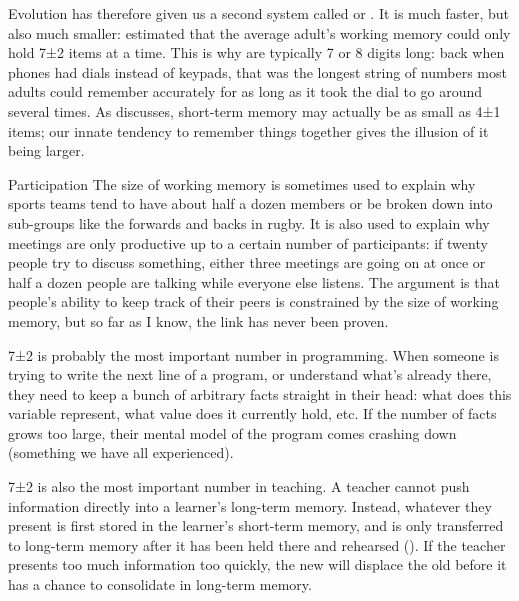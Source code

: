 Evolution has therefore given us a second system called
 or . It is much faster, but also much smaller:
\cite{Mill1956} estimated that the average adult's working memory
could only hold 7±2 items at a time. This is why  are typically 7 or 8 digits long: back when
phones had dials instead of keypads, that was the longest string of
numbers most adults could remember accurately for as long as it took
the dial to go around several times. As 
discusses, short-term memory may actually be as small as 4±1 items;
our innate tendency to remember things together gives the illusion of
it being larger.

\begin{aside}{Participation}
  The size of working memory is sometimes used to explain why sports
  teams tend to have about half a dozen members or be broken down into
  sub-groups like the forwards and backs in rugby. It is also used to
  explain why meetings are only productive up to a certain number of
  participants: if twenty people try to discuss something, either three
  meetings are going on at once or half a dozen people are talking while
  everyone else listens. The argument is that people's ability to keep
  track of their peers is constrained by the size of working memory, but
  so far as I know, the link has never been proven.
\end{aside}

7±2 is probably the most important number in programming. When
someone is trying to write the next line of a program, or understand
what's already there, they need to keep a bunch of arbitrary facts
straight in their head: what does this variable represent, what value
does it currently hold, etc. If the number of facts grows too large,
their mental model of the program comes crashing down (something we have
all experienced).

7±2 is also the most important number in teaching. A teacher cannot
push information directly into a learner's long-term memory. Instead,
whatever they present is first stored in the learner's short-term
memory, and is only transferred to long-term memory after it has been
held there and rehearsed (). If the
teacher presents too much information too quickly, the new will
displace the old before it has a chance to consolidate in long-term
memory.

